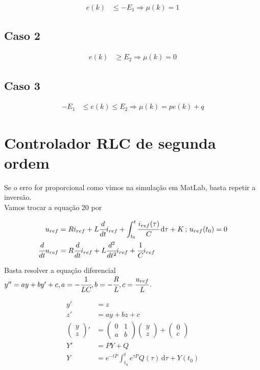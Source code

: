 \documentclass[12pt]{article}
\begin{document}
\begin{align}
  e(k) &\le - E_1 \Rightarrow \mu(k) = 1
\end{align}

\subsection{Caso 2}

\begin{align}
   e(k) &\ge E_2 \Rightarrow \mu(k) = 0
\end{align}

\subsection{Caso 3}

\begin{align}
  - E_1 &\le e(k) \le E_2 \Rightarrow \mu(k) = p e(k) + q
\end{align}

\section{Controlador RLC de segunda ordem}

\begin{flushleft}
Se o erro for proporcional como vimos na simula\c{c}\~ao em MatLab, basta repetir a invers\~ao. \\
Vamos trocar a equa\c{c}\~ao 20 por
\end{flushleft}

\begin{align}
 u_{ref} &= R i_{ref} + L \cfrac{d}{dt} i_{ref} + \int_{t_0}^t \cfrac{i_{ref}(\tau)}{C}\, \mathrm{d}\tau + K\,;\,u_{ref}(t_0) = 0 \\
  \cfrac{d}{dt} u_{ref} &= R \cfrac{d}{dt} i_{ref} + L \cfrac{d^2}{dt^2} i_{ref} + \cfrac{1}{C}i_{ref}
\end{align}

Basta resolver a equa\c{c}\~ao diferencial $y'' = a y + b y' + c, a = -\cfrac{1}{LC}, b = - \cfrac{R}{L}, c = \cfrac{u_{ref}}{L}$.

\begin{align}
 y' &= z \\
 z' &= ay + bz + c \\
 \begin{pmatrix} y \\ z \end{pmatrix}' &= \begin{pmatrix} 0 & 1 \\ a & b \end{pmatrix}\begin{pmatrix} y \\ z \end{pmatrix} + \begin{pmatrix} 0 \\ c \end{pmatrix} \\
 Y' &= P Y + Q \\
 Y &= e^{-tP} \int_{t_0}^t e^{\tau P} Q(\tau)\, \mathrm{d}\tau + Y(t_0)
\end{align}
\end{document}
